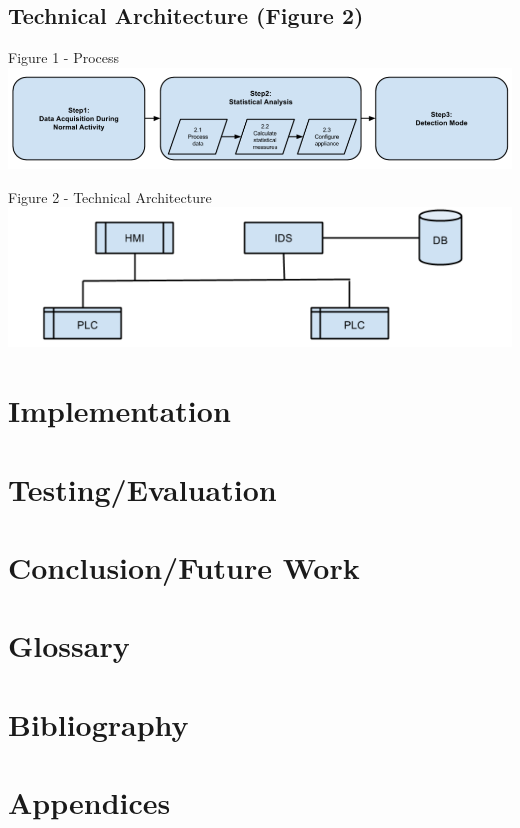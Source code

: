 \documentclass[]{article}
\begin{document}
\subsection{Technical Architecture (Figure
2)}\label{technical-architecture-figure-2}

Figure 1 -
Process\\\includegraphics{reportV1_files/figure-latex/unnamed-chunk-2-1.pdf}

Figure 2 - Technical
Architecture\\\includegraphics{reportV1_files/figure-latex/unnamed-chunk-3-1.pdf}

\section{Implementation}\label{implementation}

\section{Testing/Evaluation}\label{testingevaluation}

\section{Conclusion/Future Work}\label{conclusionfuture-work}

\section{Glossary}\label{glossary}

\section{Bibliography}\label{bibliography}

\section{Appendices}\label{appendices}
\end{document}
